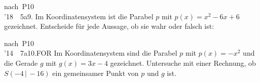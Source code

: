 \documentclass[11pt]{article}
\newcommand{\gzwei}[2]{\par\smallskip\noindent\sbox{\gbox}{#1}%
  \setlength{\gLinks}{\dimexpr\wd\gbox+6mm\relax}%
  \ifdim\gLinks>0.62\linewidth
    \usebox{\gbox}\par\smallskip\noindent\begin{minipage}{\linewidth}#2\end{minipage}%
  \else
    \begin{minipage}[t]{\gLinks}\vspace{0pt}\usebox{\gbox}\end{minipage}%
    \begin{minipage}[t]{\dimexpr\linewidth-\gLinks\relax}\vspace{0pt}\raggedright #2\end{minipage}%
  \fi\par}
\newcommand{\karo}[1]{\par\smallskip\noindent\begin{tikzpicture}
  \clip (0,0) rectangle ({\linewidth-1mm},{#1*10mm});
  \draw[black!16,line width=0.3pt,step=5mm] (0,0) grid ({\linewidth},{#1*10mm});
  \end{tikzpicture}\par}
\newcommand{\pkt}{\textperiodcentered{}}
\newcommand{\gwahrfalsch}[2]{\par\noindent\hangindent2.2em\hangafter1\makebox[2.2em][l]{(#1)}#2\hfill\mbox{wahr $\square$\quad falsch $\square$}\par}
\begin{document}
\begin{pfaufg}{nach~P10\\’18~\pkt{}~5a}{9.}{}
Im Koordinatensystem ist die Parabel $p$ mit $p(x) = x^2 - 6x + 6$ gezeichnet. Entscheide für jede Aussage, ob sie wahr oder falsch ist:
\gzwei{\begin{ksys}[xmin=-3,xmax=7,ymin=-4,ymax=7,karo=0.5]\parabel{1}{3}{-3}{p}\end{ksys}}{\vspace{1mm}\gwahrfalsch{1}{Der Punkt $(5\,|\,1)$ liegt auf $p$.}\gwahrfalsch{2}{$p$ ist die Normalparabel, um 3 nach rechts und um 3 nach unten verschoben.}\gwahrfalsch{3}{$p$ schneidet die y-Achse im Punkt $(6\,|\,0)$.}}
\end{pfaufg}
\begin{pfaufg}{nach~P10\\’14~\pkt{}~7a}{10.}{FOR}
Im Koordinatensystem sind die Parabel $p$ mit $p(x) = -x^2$ und die Gerade $g$ mit $g(x) = 3x - 4$ gezeichnet. Untersuche mit einer Rechnung, ob $S(-4\,|\,-16)$ ein gemeinsamer Punkt von $p$ und $g$ ist.
\gzwei{\begin{ksys}[xmin=-6,xmax=6,ymin=-6,ymax=6,karo=0.5]\parabel{-1}{0}{0}{p}\gerade[2.5]{3}{-4}{g}\end{ksys}}{\karo{4}}
\end{pfaufg}
\end{document}
